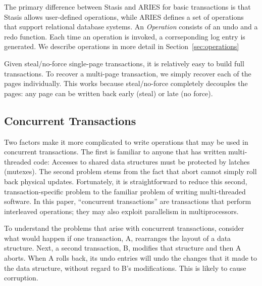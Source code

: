 \documentclass[letterpaper,twocolumn,10pt]{article}
\newcommand{\yad}{Stasis\xspace}
\newcommand{\yads}{Stasis'\xspace}
\begin{document}
The primary difference between \yad and ARIES for basic transactions
is that \yad allows user-defined operations, while ARIES defines a set
of operations that support relational database systems.  An {\em
Operation} consists of an undo and a redo function.  Each time an
operation is invoked, a corrseponding log entry is generated.  We
describe operations in more detail in Section~\ref{sec:operations}


Given steal/no-force single-page transactions, it is relatively easy
to build full transactions. 
To recover a multi-page transaction, we simply recover each of
the pages individually.  This works because steal/no-force completely
decouples the pages: any page can be written back early (steal) or
late (no force).  

\subsection{Concurrent Transactions}
\label{sec:nta}

Two factors make it more complicated to write operations that may be
used in concurrent transactions.  The first is familiar to anyone that
has written multi-threaded code: Accesses to shared data structures
must be protected by latches (mutexes).  The second problem stems from
the fact that abort cannot simply roll back physical updates.
Fortunately, it is straightforward to reduce this second,
transaction-specific problem to the familiar problem of writing
multi-threaded software.  In this paper, ``concurrent
transactions'' are transactions that perform interleaved operations; they may also exploit parallelism in multiprocessors.


To understand the problems that arise with concurrent transactions,
consider what would happen if one transaction, A, rearranges the
layout of a data structure.  Next, a second transaction, B,
modifies that structure and then A aborts.  When A rolls back, its
undo entries will undo the changes that it made to the data
structure, without regard to B's modifications.  This is likely to
cause corruption.
\end{document}
